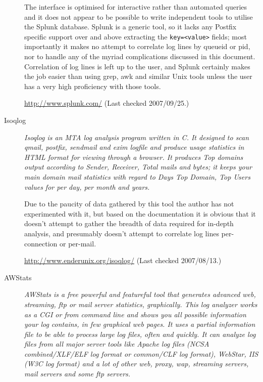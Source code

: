 \documentclass[a4paper,12pt,draft]{article}
\begin{document}
\begin{description}
        The interface is optimised for interactive rather than automated
        queries and it does not appear to be possible to write independent
        tools to utilise the Splunk database.  Splunk is a generic tool, so
        it lacks any Postfix specific support over and above extracting
        the \texttt{key=<value>} fields; most importantly it makes no
        attempt to correlate log lines by queueid or pid, nor to handle any
        of the myriad complications discussed in this document.
        Correlation of log lines is left up to the user, and Splunk
        certainly makes the job easier than using grep, awk and similar
        Unix tools unless the user has a very high proficiency with those
        tools.

        \url{http://www.splunk.com/} \newline (Last checked 2007/09/25.)

    \item [Isoqlog] \textit{Isoqlog is an MTA log analysis program written
        in C. It designed to scan qmail, postfix, sendmail and exim logfile
        and produce usage statistics in HTML format for viewing through a
        browser. It produces Top domains output according to Sender,
        Receiver, Total mails and bytes; it keeps your main domain mail
        statistics with regard to Days Top Domain, Top Users values for per
        day, per month and years.\/}

        Due to the paucity of data gathered by this tool the author has not
        experimented with it, but based on the documentation it is obvious
        that it doesn't attempt to gather the breadth of data required for
        in-depth analysis, and presumably doesn't attempt to correlate log
        lines per-connection or per-mail.

        \url{http://www.enderunix.org/isoqlog/} \newline (Last checked
        2007/08/13.)

    \item [AWStats] \textit{AWStats is a free powerful and featureful tool
        that generates advanced web, streaming, ftp or mail server
        statistics, graphically. This log analyzer works as a CGI or from
        command line and shows you all possible information your log
        contains, in few graphical web pages. It uses a partial information
        file to be able to process large log files, often and quickly. It
        can analyze log files from all major server tools like Apache log
        files (NCSA combined/XLF/ELF log format or common/CLF log format),
        WebStar, IIS (W3C log format) and a lot of other web, proxy, wap,
        streaming servers, mail servers and some ftp servers.\/}
        

\end{description}
\end{document}
